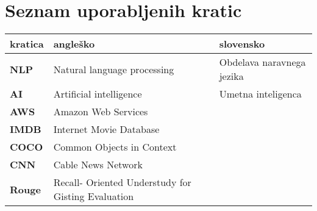 \chapter*{Seznam uporabljenih kratic}
\begin{center}
\begin{tabular}{l|l|l}
  {\bf kratica} & {\bf angleško} & {\bf slovensko} \\ \hline
    {\bf NLP} & Natural language processing & Obdelava naravnega jezika\\
  {\bf AI} & Artificial intelligence & Umetna inteligenca \\
  {\bf AWS} & Amazon Web Services \\
  {\bf IMDB} & Internet Movie Database  \\
    {\bf COCO} & Common Objects in Context \\
      {\bf CNN} & Cable News Network  \\
        {\bf Rouge} & Recall- Oriented 
        Understudy for Gisting Evaluation \\
\end{tabular}
\end{center}